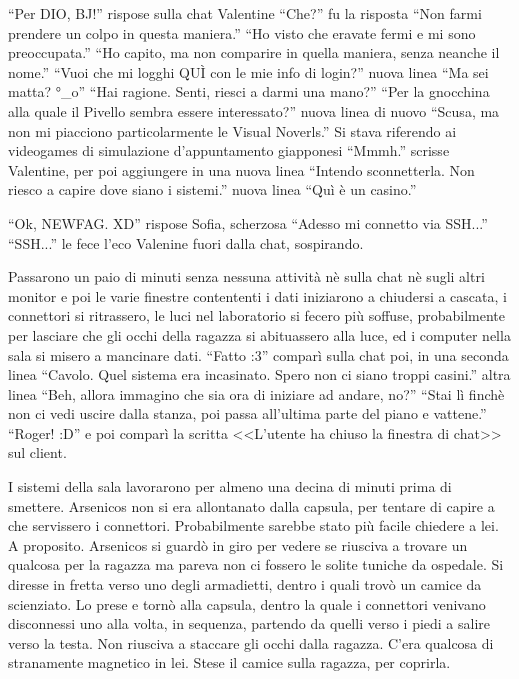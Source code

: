     ``Per DIO, BJ!'' rispose sulla chat Valentine ``Che?'' fu la risposta ``Non farmi prendere un colpo in questa
    maniera.'' ``Ho visto che eravate fermi e mi sono preoccupata.'' ``Ho capito, ma non comparire in quella maniera,
    senza neanche il nome.'' ``Vuoi che mi logghi QUÌ con le mie info di login?'' nuova linea ``Ma sei matta? °\_o''
    ``Hai ragione. Senti, riesci a darmi una mano?'' ``Per la gnocchina alla quale il Pivello sembra essere
    interessato?'' nuova linea di nuovo ``Scusa, ma non mi piacciono particolarmente le Visual Noverls.'' Si stava
    riferendo ai videogames di simulazione d'appuntamento giapponesi ``Mmmh.'' scrisse Valentine, per poi aggiungere in
    una nuova linea ``Intendo sconnetterla. Non riesco a capire dove siano i sistemi.'' nuova linea ``Quì è un casino.''

    ``Ok, NEWFAG. XD'' rispose Sofia, scherzosa ``Adesso mi connetto via SSH...'' ``SSH...'' le fece l'eco Valenine
    fuori dalla chat, sospirando.

    Passarono un paio di minuti senza nessuna attività nè sulla chat nè sugli altri monitor e poi le varie finestre
    contententi i dati iniziarono a chiudersi a cascata, i connettori si ritrassero, le luci nel laboratorio si fecero
    più soffuse, probabilmente per lasciare che gli occhi della ragazza si abituassero alla luce, ed i computer nella
    sala si misero a mancinare dati. ``Fatto :3'' comparì sulla chat poi, in una seconda linea ``Cavolo. Quel sistema
    era incasinato. Spero non ci siano troppi casini.'' altra linea ``Beh, allora immagino che sia ora di iniziare ad
    andare, no?'' ``Stai lì finchè non ci vedi uscire dalla stanza, poi passa all'ultima parte del piano e vattene.''
    ``Roger! :D'' e poi comparì la scritta <<L'utente ha chiuso la finestra di chat>> sul client.

    I sistemi della sala lavorarono per almeno una decina di minuti prima di smettere. Arsenicos non si era allontanato
    dalla capsula, per tentare di capire a che servissero i connettori. Probabilmente sarebbe stato più facile chiedere
    a lei. A proposito. Arsenicos si guardò in giro per vedere se riusciva a trovare un qualcosa per la ragazza ma
    pareva non ci fossero le solite tuniche da ospedale. Si diresse in fretta verso uno degli armadietti, dentro i quali
    trovò un camice da scienziato. Lo prese e tornò alla capsula, dentro la quale i connettori venivano disconnessi uno
    alla volta, in sequenza, partendo da quelli verso i piedi a salire verso la testa. Non riusciva a staccare gli occhi
    dalla ragazza. C'era qualcosa di stranamente magnetico in lei. Stese il camice sulla ragazza, per coprirla.

